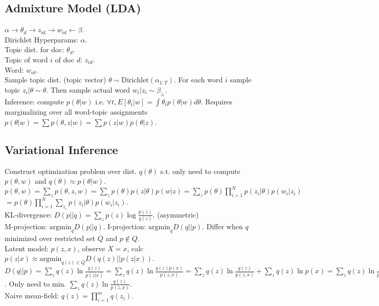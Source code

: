 \subsection*{Admixture Model (LDA)}

$\alpha \rightarrow \theta_d \rightarrow z_{id} \rightarrow w_{id} \leftarrow \beta$.\\
Dirichlet Hyperparams: $\alpha$.\\
Topic dist. for doc: $\theta_d$.\\
Topic of word $i$ of doc $d$: $z_{id}$.\\
Word: $w_{id}$.\\
Sample topic dist. (topic vector) $\theta \sim \text{Dirichlet}(\alpha_{1:T})$. For each word $i$ sample topic $z_i | \theta \sim \theta$. Then sample actual word $w_i | z_i \sim \beta_{z_i}$.\\
Inference: compute $p(\theta|w)$ i.e. $\forall t, E[\theta_t | w] = \int \theta_t p(\theta|w) d\theta$. Requires marginalizing over all word-topic assignments $p(\theta|w) = \sum p(\theta,z|w) = \sum p(z|w)p(\theta|z)$.\\

\subsection*{Variational Inference}

Construct optimization problem over dist. $q(\theta)$ s.t. only need to compute $p(\theta, w)$ and $q(\theta) \approx p(\theta|w)$.\\
$p(\theta, w) = \sum_z p(\theta,z,w) = \sum_z p(\theta) p(z|\theta) p(w|z) = \sum_z p(\theta) \prod_{i=1}^N p(z_i|\theta) p(w_i|z_i)$\\
$= p(\theta) \prod_{i=1}^N \sum_{z_i} p(z_i|\theta) p(w_i|z_i)$.\\
KL-divergence: $D(p||q) = \sum_z p(z)\log\frac{p(z)}{q(z)}$. (asymmetric)\\
M-projection: $\text{argmin}_q D(p||q)$. I-projection: $\text{argmin}_q D(q||p)$. Differ when $q$ minimized over restricted set $Q$ and $p\not\in Q$.\\
Latent model: $p(z, x)$, observe $X=x$, calc $p(z|x) \approx \text{argmin}_{q(z) \in Q} D(q(z)||p(z|x))$.\\
$D(q||p) = \sum_z q(z)\ln \frac{q(z)}{p(z|x)} = \sum_z q(z)\ln\frac{q(z)p(x)}{p(z,x)} = \sum_z q(z)\ln\frac{q(z)}{p(z,x)}+\sum_z q(z)\ln p(x) = \sum_z q(z)\ln\frac{q(z)}{p(z,x)}+\ln p(x)$. Only need to min. $\sum_z q(z)\ln\frac{q(z)}{p(z,x)}$.\\
Naive mean-field: $q(z) = \prod_{i=1}^m q(z_i)$.\\


